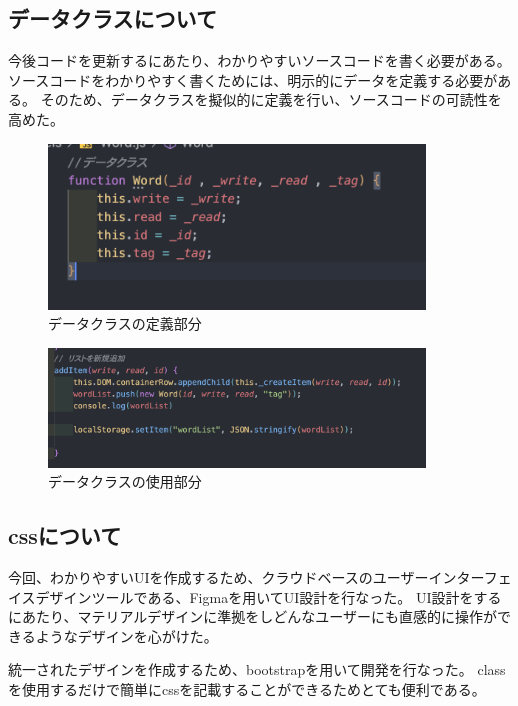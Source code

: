 \documentclass[11pt,a4paper]{jsarticle}
\begin{document}
\subsection{データクラスについて}

今後コードを更新するにあたり、わかりやすいソースコードを書く必要がある。
ソースコードをわかりやすく書くためには、明示的にデータを定義する必要がある。
そのため、データクラスを擬似的に定義を行い、ソースコードの可読性を高めた。

\begin{figure}[htbp]
    \begin{center}
        \includegraphics[width=100mm]{./img/model.png}
    \end{center}
    \caption{データクラスの定義部分}
\end{figure}

\begin{figure}[htbp]
    \begin{center}
        \includegraphics[width=100mm]{./img/new_word.png}
    \end{center}
    \caption{データクラスの使用部分}
\end{figure}

\subsection{cssについて}
今回、わかりやすいUIを作成するため、クラウドベースのユーザーインターフェイスデザインツールである、Figmaを用いてUI設計を行なった。
UI設計をするにあたり、マテリアルデザインに準拠をしどんなユーザーにも直感的に操作ができるようなデザインを心がけた。

統一されたデザインを作成するため、bootstrapを用いて開発を行なった。
classを使用するだけで簡単にcssを記載することができるためとても便利である。
\end{document}
